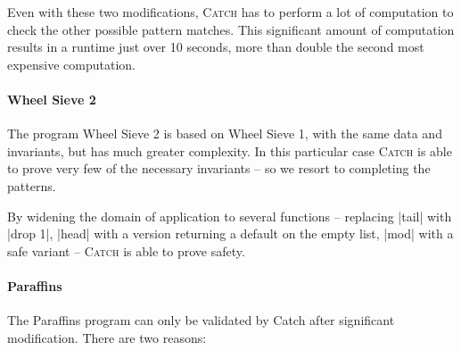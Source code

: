 \documentclass[preprint]{sigplanconf}
\newcommand{\catch}{\textsc{Catch}}
\begin{document}
Even with these two modifications, \catch{} has to perform a lot of computation to check the other possible pattern matches. This significant amount of computation results in a runtime just over 10 seconds, more than double the second most expensive computation.


\paragraph{Wheel Sieve 2}

The program Wheel Sieve 2 is based on Wheel Sieve 1, with the same data and invariants, but has much greater complexity. In this particular case \catch{} is able to prove very few of the necessary invariants -- so we resort to completing the patterns.

By widening the domain of application to several functions -- replacing |tail| with |drop 1|, |head| with a version returning a default on the empty list, |mod| with a safe variant -- \catch{} is able to prove safety.


\paragraph{Paraffins}

The Paraffins program can only be validated by Catch after significant modification. There are two reasons:
\end{document}
